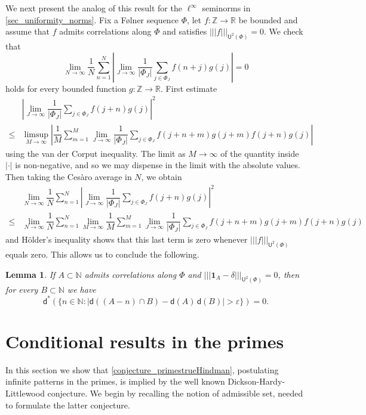 \documentclass[10pt,dvipsnames]{article}
\newtheorem{lemma}[theorem]{Lemma}
\theoremstyle{definition}
\theoremstyle{plain}
\newcommand{\R}{\mathbb{R}}
\newcommand{\Z}{\mathbb{Z}}
\newcommand{\N}{\mathbb{N}}
\newcommand{\dens}{\mathsf{d}}
\newcommand{\Cesaro}{Ces\`{a}ro}
\newcommand{\Folner}{F\o{}lner}
\newcommand{\Holder}{H\"{o}lder}
\newcommand{\one}{\boldsymbol{1}}
\newcommand{\ghk}{|\!|\!|}
\newcommand{\ghkn}[1]{\ghk {#1} \ghk}
\newcommand{\un}[2]{{\mathsf{U}^{#1}(#2)}}
\begin{document}
\begin{appendices}
We next present the analog of this result for the $\ell^\infty$ seminorms in \cref{sec_uniformity_norms}.
Fix a \Folner{} sequence $\Phi$, let $f\colon \Z \to \R$ be bounded and assume that $f$ admits correlations along $\Phi$ and satisfies $\ghkn{f}_\un{2}{\Phi} = 0$.
We check that
\[
\lim_{N \to \infty} \dfrac{1}{N} \sum_{n=1}^N \left| \lim_{J \to \infty} \dfrac{1}{|\Phi_J|} \sum_{j \in \Phi_J} f(n+j) g(j) \right| = 0
\]
holds for every bounded function $g \colon  \Z \to \R$.
First estimate
\begin{align*}
& \left| \lim_{J \to \infty} \dfrac{1}{|\Phi_J|}  \sum_{j \in \Phi_J} f(j+n)g(j) \right|^2
\\
\le
&{}
\limsup_{M \to \infty} \left| \dfrac{1}{M} \sum_{m=1}^M \lim_{J \to \infty} \dfrac{1}{|\Phi_J|} \sum_{j \in \Phi_J} f(j+n+m) g(j+m) f(j+n) g(j) \right|
\end{align*}
using the van der Corput  inequality.
The limit as $M \to \infty$ of the quantity inside $| \cdot |$ is non-negative, and so we may dispense in the limit with the absolute values.
Then taking the \Cesaro{} average in $N$, we obtain
\begin{align*}
&
\lim_{N \to \infty} \dfrac{1}{N} \sum_{n=1}^N \left| \lim_{J \to \infty} \dfrac{1}{|\Phi_J|} \sum_{j \in \Phi_J} f(j+n) g(j) \right|^2
\\
\le
&
\lim_{N \to \infty} \dfrac{1}{N} \sum_{n=1}^N
\lim_{M \to \infty} \dfrac{1}{M} \sum_{m=1}^M
\lim_{J \to \infty} \dfrac{1}{|\Phi_J|} \sum_{j \in \Phi_J}
f(j+n+m) g(j+m) f(j+n) g(j)
\end{align*} 
and \Holder{}'s inequality shows that this last term is zero whenever $\ghkn{f}_\un{2}{\Phi}$ equals zero.
This allows us to conclude the following.  
\begin{lemma}\label{lemma_weakmixingisback}
    If $A \subset \N$ admits correlations along $\Phi$ and $\ghkn{\one_A - \delta}_\un{2}{\Phi} = 0$, then for every $B \subset \N$ we have
\[
\dens^*(\{ n \in \N : |\dens((A - n) \cap B) - \dens(A) \, \dens(B)| > \varepsilon \})=0.
\]
\end{lemma}

\section{Conditional results in the primes}
\label{appendixDHL}

In this section we show that \cref{conjecture_primestrueHindman}, postulating infinite patterns in the primes, is implied by the well known Dickson-Hardy-Littlewood conjecture. We begin by recalling the notion of admissible set, needed to formulate the latter conjecture.



\end{appendices}
\end{document}
